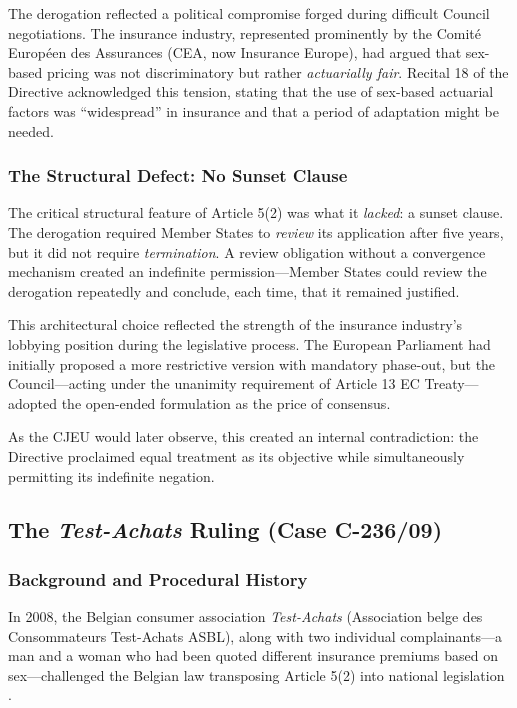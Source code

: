 \documentclass[12pt,a4paper]{article}
\begin{document}
The derogation reflected a political compromise forged during difficult Council negotiations. The insurance industry, represented prominently by the Comit\'{e} Europ\'{e}en des Assurances (CEA, now Insurance Europe), had argued that sex-based pricing was not discriminatory but rather \emph{actuarially fair}. Recital 18 of the Directive acknowledged this tension, stating that the use of sex-based actuarial factors was ``widespread'' in insurance and that a period of adaptation might be needed.

\subsubsection{The Structural Defect: No Sunset Clause}

The critical structural feature of Article 5(2) was what it \emph{lacked}: a sunset clause. The derogation required Member States to \emph{review} its application after five years, but it did not require \emph{termination}. A review obligation without a convergence mechanism created an indefinite permission---Member States could review the derogation repeatedly and conclude, each time, that it remained justified.

This architectural choice reflected the strength of the insurance industry's lobbying position during the legislative process. The European Parliament had initially proposed a more restrictive version with mandatory phase-out, but the Council---acting under the unanimity requirement of Article 13 EC Treaty---adopted the open-ended formulation as the price of consensus.

As the CJEU would later observe, this created an internal contradiction: the Directive proclaimed equal treatment as its objective while simultaneously permitting its indefinite negation.

\subsection{The \emph{Test-Achats} Ruling (Case C-236/09)}
\label{subsec:test-achats}

\subsubsection{Background and Procedural History}

In 2008, the Belgian consumer association \emph{Test-Achats} (Association belge des Consommateurs Test-Achats ASBL), along with two individual complainants---a man and a woman who had been quoted different insurance premiums based on sex---challenged the Belgian law transposing Article 5(2) into national legislation \cite{testachats2011}.
\end{document}
